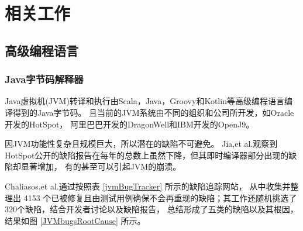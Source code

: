 \section{相关工作}
\label{section:relatedWork}
	\subsection{高级编程语言}
		\subsubsection{Java字节码解释器}
		Java虚拟机(JVM)转译和执行由Scala，Java，Groovy和Kotlin等高级编程语言编译得到的Java字节码。
		且当前的JVM系统由不同的组织和公司所开发，如Oracle开发的HotSpot\cite{OracleHotspot}，
		阿里巴巴开发的DragonWell\cite{DragonWell}和IBM开发的OpenJ9\cite{IBMOpenJ9}。

		因JVM功能性复杂且规模巨大\cite{sonoyamaPerformanceStudyKotlin2021}，所以潜在的缺陷不可避免\cite{jiaDetectingJVMJIT2023}。
		Jia,et al.\cite{jiaDetectingJVMJIT2023}观察到HotSpot公开的缺陷报告在每年的总数上虽然下降，但其即时编译器部分出现的缺陷却显著增加，
		有的甚至可以引起JVM的崩溃\cite{JVMcrashReport}。

		Chaliasos,et al.\cite{chaliasosWelltypedProgramsCan2021}通过按照表 \ref{jvmBugTracker} 所示的缺陷追踪网站，
		从中收集并整理出 4153 个已被修复且由测试用例确保不会再重现的缺陷；其工作还随机挑选了320个缺陷，结合开发者讨论以及缺陷报告，
		总结形成了五类的缺陷以及其根因，结果如图 \ref{JVMbugsRootCause} 所示。

